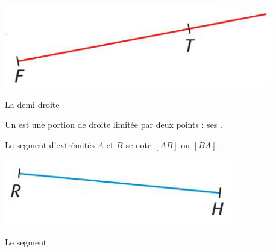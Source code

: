 \begin{myex}
	\begin{center}
		\includegraphics[scale=0.55]{img/demi-droite}
	\end{center}

	La demi droite 
\end{myex}

\begin{mydef}
	Un  est une portion de droite limitée par deux points : ses .
\end{mydef}


\begin{myprop}
	Le segment d'extrémités $A$ et $B$ se note $[AB]$ ou $[BA]$.
\end{myprop}

\begin{myex}
	\begin{center}
		\includegraphics[scale=0.55]{img/segment}
	\end{center}
	
	Le segment 
\end{myex}
